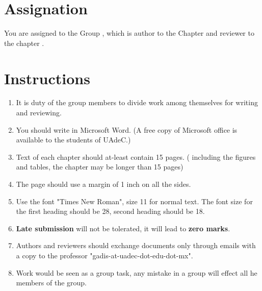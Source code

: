 \documentclass{article}
\begin{document}
{		\section{Assignation}
			You are assigned to the Group {\VarOOA}, which is author to the Chapter {\VarOOA} and reviewer to the chapter {\VarOOB}.
		\section{Instructions}
		\begin{enumerate}
			\item It is duty of the group members to divide work among themselves for writing and reviewing.
			\item You should write in Microsoft Word. (A free copy of Microsoft office is available to the students of UAdeC.)
			\item Text of each chapter should at-least contain 15 pages. ( including the figures and tables, the chapter may be longer than 15 pages)
			\item The page should use a margin of 1 inch on all the sides.
			\item Use the font "Times New Roman", size 11 for normal text. The font size for the first heading should be 28, second heading should be 18.
			\item \textbf{Late submission} will not be tolerated, it will lead to \textbf{zero marks}.
			\item Authors and reviewers should exchange documents only through emails with a copy to the professor "gadis-at-uadec-dot-edu-dot-mx".
			\item Work would be seen as a group task, any mistake in a group will effect all he members of the group.
		\end{enumerate}
}
\end{document}
